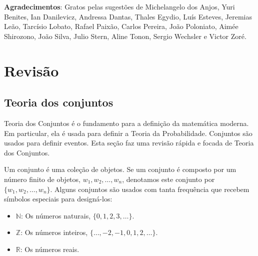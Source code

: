 



\maketitle

\vspace{20mm}

\textbf{Agradecimentos}: Gratos pelas sugestões de
Michelangelo dos Anjos, Yuri Benites, Ian Danilevicz, Andressa Dantas, Thales Egydio, Luís Esteves, Jeremias Leão, Tarcísio Lobato, Rafael Paixão, Carlos Pereira, João Poloniato,  Aimée Shirozono, João Silva, Julio Stern, Aline Tonon, Sergio Wechsler e Victor Zoré.

\newpage
 
\tableofcontents
  
\newpage


\section{Revisão}
\label{sec:prologue}

\subsection{Teoria dos conjuntos}
\label{sec:sets}
  
	Teoria dos Conjuntos é o fundamento para a definição da matemática moderna.
	Em particular, ela é usada para definir a Teoria da Probabilidade.
	Conjuntos são usados para definir eventos.
	Esta seção faz uma revisão rápida e focada de Teoria dos Conjuntos.
  
	Um conjunto é uma coleção de objetos.
	Se um conjunto é composto por um número finito de objetos, $w_{1}, w_{2}, \ldots, w_{n}$,
	denotamos este conjunto por $\{w_{1},w_{2},\ldots,w_{n}\}$.
	Alguns conjuntos são usados com tanta frequência que recebem símbolos especiais para designá-los:
	\begin{itemize}
	 \item $\mathbb{N}$: Os números naturais, $\{0,1,2,3,\ldots\}$.
	 \item $\mathbb{Z}$: Os números inteiros, $\{\ldots,-2,-1,0,1,2,\ldots\}$.
	 \item $\mathbb{R}$: Os números reais.
	\end{itemize}
  
